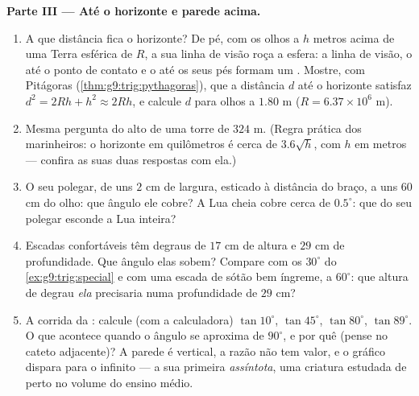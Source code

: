 \begin{problem}
\medskip
\noindent\textbf{Parte III --- Até o horizonte e parede acima.}
\begin{enumerate}[resume]
  \item A que distância fica o horizonte? De pé, com os olhos a $h$
        metros acima de uma Terra esférica de  $R$, a sua linha de
        visão roça a esfera: a linha de visão, o  até o ponto de
        contato e o  até os seus pés formam um .
        Mostre, com Pitágoras (\cref{thm:g9:trig:pythagoras}), que a
        distância $d$ até o horizonte satisfaz
        $d^2 = 2Rh + h^2 \approx 2Rh$, e calcule $d$ para olhos a
        $1.80$ m ($R = 6.37 \times 10^6$ m).
  \item Mesma pergunta do alto de uma torre de $324$ m. (Regra prática
        dos marinheiros: o horizonte em quilômetros é cerca de
        $3.6\sqrt{h}$, com $h$ em metros --- confira as suas duas
        respostas com ela.)
  \item O seu polegar, de uns $2$ cm de largura, esticado à distância
        do braço, a uns $60$ cm do olho: que ângulo ele cobre? A Lua
        cheia cobre cerca de $0.5^\circ$: que  do seu polegar
        esconde a Lua inteira?
  \item Escadas confortáveis têm degraus de $17$ cm de altura e $29$ cm
        de profundidade. Que ângulo elas sobem? Compare com os
        $30^\circ$ do \cref{ex:g9:trig:special} e com uma escada de
        sótão bem íngreme, a $60^\circ$: que altura de degrau
        \emph{ela} precisaria numa profundidade de $29$ cm?
  \item A corrida da : calcule (com a calculadora)
        $\tan 10^\circ$, $\tan 45^\circ$, $\tan 80^\circ$,
        $\tan 89^\circ$. O que acontece quando o ângulo se aproxima de
        $90^\circ$, e por quê (pense no cateto adjacente)? A parede é
        vertical, a razão não tem valor, e o gráfico dispara para o
        infinito --- a sua primeira \emph{assíntota}, uma criatura
        estudada de perto no volume do ensino médio.
\end{enumerate}
\end{problem}
